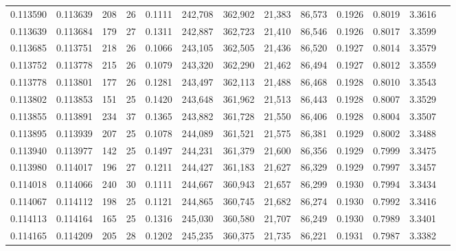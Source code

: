 \begin{tabular}{rrrrrrrrrrrrr}
0.113590 & 0.113639 & 208 &  26 &                                     0.1111 & 242,708 & 362,902 &  21,383 &  86,573 & 0.1926 & 0.8019 & 3.3616 \\
0.113639 & 0.113684 & 179 &  27 &                                     0.1311 & 242,887 & 362,723 &  21,410 &  86,546 & 0.1926 & 0.8017 & 3.3599 \\
0.113685 & 0.113751 & 218 &  26 &                                     0.1066 & 243,105 & 362,505 &  21,436 &  86,520 & 0.1927 & 0.8014 & 3.3579 \\
0.113752 & 0.113778 & 215 &  26 &                                     0.1079 & 243,320 & 362,290 &  21,462 &  86,494 & 0.1927 & 0.8012 & 3.3559 \\
0.113778 & 0.113801 & 177 &  26 &                                     0.1281 & 243,497 & 362,113 &  21,488 &  86,468 & 0.1928 & 0.8010 & 3.3543 \\
0.113802 & 0.113853 & 151 &  25 &                                     0.1420 & 243,648 & 361,962 &  21,513 &  86,443 & 0.1928 & 0.8007 & 3.3529 \\
0.113855 & 0.113891 & 234 &  37 &                                     0.1365 & 243,882 & 361,728 &  21,550 &  86,406 & 0.1928 & 0.8004 & 3.3507 \\
0.113895 & 0.113939 & 207 &  25 &                                     0.1078 & 244,089 & 361,521 &  21,575 &  86,381 & 0.1929 & 0.8002 & 3.3488 \\
0.113940 & 0.113977 & 142 &  25 &                                     0.1497 & 244,231 & 361,379 &  21,600 &  86,356 & 0.1929 & 0.7999 & 3.3475 \\
0.113980 & 0.114017 & 196 &  27 &                                     0.1211 & 244,427 & 361,183 &  21,627 &  86,329 & 0.1929 & 0.7997 & 3.3457 \\
0.114018 & 0.114066 & 240 &  30 &                                     0.1111 & 244,667 & 360,943 &  21,657 &  86,299 & 0.1930 & 0.7994 & 3.3434 \\
0.114067 & 0.114112 & 198 &  25 &                                     0.1121 & 244,865 & 360,745 &  21,682 &  86,274 & 0.1930 & 0.7992 & 3.3416 \\
0.114113 & 0.114164 & 165 &  25 &                                     0.1316 & 245,030 & 360,580 &  21,707 &  86,249 & 0.1930 & 0.7989 & 3.3401 \\
0.114165 & 0.114209 & 205 &  28 &                                     0.1202 & 245,235 & 360,375 &  21,735 &  86,221 & 0.1931 & 0.7987 & 3.3382 \\

\end{tabular}
